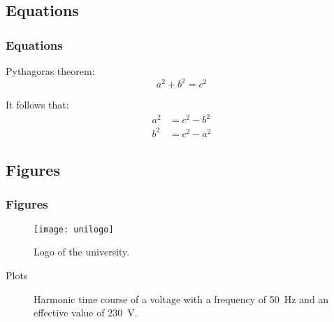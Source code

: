 \documentclass[aspectratio=3218]{beamer}
\begin{document}
\subsection{Equations}

\begin{frame}
	\frametitle<presentation>{Equations}
	\begin{block}{Pythagoras theorem:}
		\begin{equation}
			a^2 + b^2 = c^2 \label{eq:pythogoras}
		\end{equation}	\end{block}
	\begin{block}{It follows that:}
		\begin{align}
			a^2 &= c^2 - b^2 \\
			b^2 &= c^2 - a^2
		\end{align} 	
 	\end{block}
\end{frame}

\subsection{Figures}

\begin{frame}
	\frametitle<presentation>{Figures}
	\begin{figure}
		\centering
			\texttt{[image: unilogo]}
		\caption{Logo of the university.}
		\label{fig:unilogo}
	\end{figure}
\end{frame}

\begin{frame}{Plots}
	\begin{figure}
		\centering
		\caption{Harmonic time course of a voltage with a frequency of \SI{50}{\hertz} 
		and an effective value of \SI{230}{\volt}.}
		\label{fig:u_t_sinus}
	\end{figure}
\end{frame}
\end{document}
